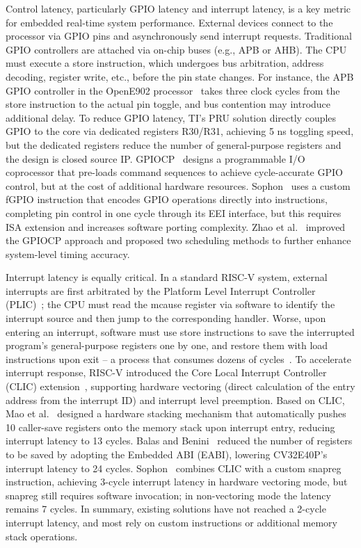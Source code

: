 \documentclass[letterpaper,journal]{IEEEtran}
\begin{document}
Control latency, particularly GPIO latency and interrupt latency, is a key metric for embedded real-time system performance.
External devices connect to the processor via GPIO pins and asynchronously send interrupt requests.
Traditional GPIO controllers are attached via on-chip buses (e.g., APB or AHB).
The CPU must execute a store instruction, which undergoes bus arbitration, address decoding, register write, etc., before the pin state changes.
For instance, the APB GPIO controller in the OpenE902 processor~\cite{ref30} takes three clock cycles from the store instruction to the actual pin toggle, and bus contention may introduce additional delay.
To reduce GPIO latency, TI's PRU solution directly couples GPIO to the core via dedicated registers R30/R31, achieving 5 ns toggling speed, but the dedicated registers reduce the number of general-purpose registers and the design is closed source IP.
GPIOCP~\cite{ref10} designs a programmable I/O coprocessor that pre-loads command sequences to achieve cycle-accurate GPIO control, but at the cost of additional hardware resources.
Sophon~\cite{ref1} uses a custom fGPIO instruction that encodes GPIO operations directly into instructions, completing pin control in one cycle through its EEI interface, but this requires ISA extension and increases software porting complexity.
Zhao et al.~\cite{ref11} improved the GPIOCP approach and proposed two scheduling methods to further enhance system-level timing accuracy.

Interrupt latency is equally critical.
In a standard RISC-V system, external interrupts are first arbitrated by the Platform Level Interrupt Controller (PLIC)~\cite{ref17}; the CPU must read the mcause register via software to identify the interrupt source and then jump to the corresponding handler.
Worse, upon entering an interrupt, software must use store instructions to save the interrupted program's general-purpose registers  one by one, and restore them with load instructions upon exit -- a process that consumes dozens of cycles~\cite{ref6}.
To accelerate interrupt response, RISC-V introduced the Core Local Interrupt Controller (CLIC) extension~\cite{ref18}, supporting hardware vectoring (direct calculation of the entry address from the interrupt ID) and interrupt level preemption.
Based on CLIC, Mao et al.~\cite{ref5} designed a hardware stacking mechanism that automatically pushes 10 caller-save registers onto the memory stack upon interrupt entry, reducing interrupt latency to 13 cycles.
Balas and Benini~\cite{ref6} reduced the number of registers to be saved by adopting the Embedded ABI (EABI), lowering CV32E40P's interrupt latency to 24 cycles.
Sophon~\cite{ref1} combines CLIC with a custom snapreg instruction, achieving 3-cycle interrupt latency in hardware vectoring mode, but snapreg still requires software invocation; in non-vectoring mode the latency remains 7 cycles.
In summary, existing solutions have not reached a 2-cycle interrupt latency, and most rely on custom instructions or additional memory stack operations.
\end{document}
